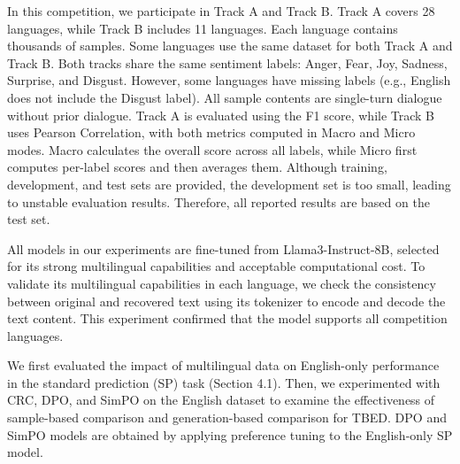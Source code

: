 \documentclass[11pt]{article}
\begin{document}
In this competition, we participate in Track A and Track B. Track A covers 28 languages, while Track B includes 11 languages. Each language contains thousands of samples. Some languages use the same dataset for both Track A and Track B. Both tracks share the same sentiment labels: Anger, Fear, Joy, Sadness, Surprise, and Disgust. However, some languages have missing labels (e.g., English does not include the Disgust label). All sample contents are single-turn dialogue without prior dialogue. Track A is evaluated using the F1 score, while Track B uses Pearson Correlation, with both metrics computed in Macro and Micro modes. Macro calculates the overall score across all labels, while Micro first computes per-label scores and then averages them. Although training, development, and test sets are provided, the development set is too small, leading to unstable evaluation results. Therefore, all reported results are based on the test set.


All models in our experiments are fine-tuned from Llama3-Instruct-8B, selected for its strong multilingual capabilities and acceptable computational cost. To validate its multilingual capabilities in each language, we check the consistency between original and recovered text using its tokenizer to encode and decode the text content. This experiment confirmed that the model supports all competition languages.


We first evaluated the impact of multilingual data on English-only performance in the standard prediction (SP) task (Section 4.1). Then, we experimented with CRC, DPO, and SimPO on the English dataset to examine the effectiveness of sample-based comparison and generation-based comparison for TBED. 
DPO and SimPO models are obtained by applying preference tuning to the English-only SP model.
\end{document}
